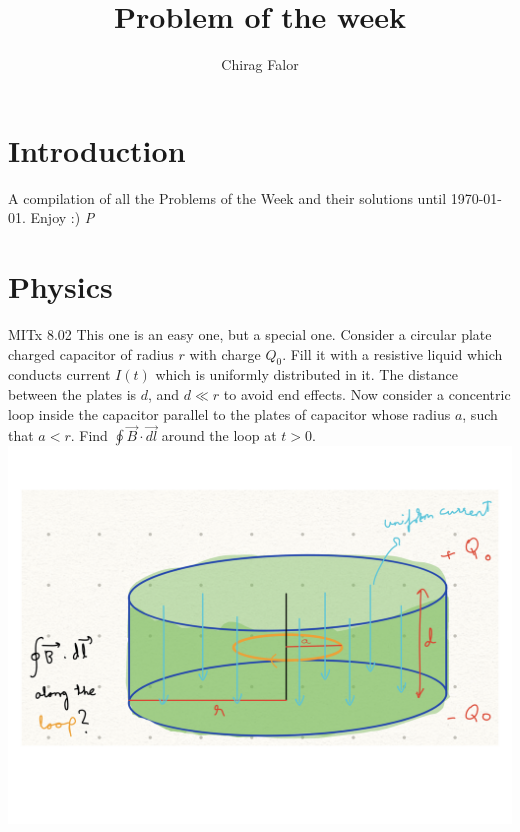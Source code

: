 \documentclass{article}
\title{Problem of the week}
\author{Chirag Falor}
\begin{document}
\maketitle
\tableofcontents
\newpage
\section*{Introduction}

A compilation of all the Problems of the Week and their solutions until \today. Enjoy :) \textit{P}

\setcounter{section}{15}

\section{Physics}

\begin{problem}[\DTMusedate{P1}]{MITx 8.02}
This one is an easy one, but a special one. Consider a circular plate charged capacitor of radius $r$ with charge $Q_0$. Fill it with a resistive liquid which conducts current $I(t)$ which is uniformly distributed in it. The distance between the plates is $d$, and $d \ll r$ to avoid end effects. Now consider a concentric loop inside the capacitor parallel to the plates of capacitor whose radius $a$, such that $a<r$. Find $\oint \vec{B} \cdot \vec{dl}$ around the loop at $t>0$.\\
\newline
\includegraphics[width=\textwidth]{ProblemPictures/capacitor_resistiveliquid.PNG}
\end{problem}
\end{document}
